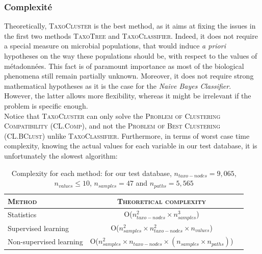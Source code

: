 \documentclass{beamer}
\begin{document}
\begin{frame}
\frametitle{Complexité}

Theoretically, \textsc{TaxoCluster} is the best method, as it aims at fixing the issues in the first two methods \textsc{TaxoTree} and \textsc{TaxoClassifier}. Indeed, it does not require a special measure on microbial populations, that would induce \emph{a priori} hypotheses on the way these populations should be, with respect to the values of métadonnées. This fact is of paramount importance as most of the biological phenomena still remain partially unknown. Moreover, it does not require strong mathematical hypotheses as it is the case for the \emph{Naive Bayes Classifier}. However, the latter allows more flexibility, whereas it might be irrelevant if the problem is specific enough.\\

Notice that \textsc{TaxoCluster} can only solve the \textsc{Problem of Clustering Compatibility (CL.Comp)}, and not the \textsc{Problem of Best Clustering (CL.BClust)} unlike \textsc{TaxoClassifier}. Furthermore, in terms of worst case time complexity, knowing the actual values for each variable in our test database, it is unfortunately the slowest algorithm:\\

    \begin{table}
      \caption{Complexity for each method: for our test database, $n_{taxo-nodes} = 9,065$, $n_{values} \le 10$, $n_{samples} = 47$ and $n_{paths} = 5,565$}
      \begin{tabular}{|l|c|r|}
        \hline
        \textsc{Method} & \textsc{Theoretical complexity} \\
        \hline
        Statistics & O($n_{taxo-nodes}^{2} \times n_{samples}^{3}$)\\
        \hline
        Supervised learning & O($n_{samples}^{2} \times n_{taxo-nodes}^{2} \times n_{values}$)\\
        \hline
        Non-supervised learning & O($n_{samples}^{2} \times n_{taxo-nodes}\times (n_{samples} \times n_{paths})$)\\
        \hline
      \end{tabular}
    \end{table}


\end{frame}
\end{document}
